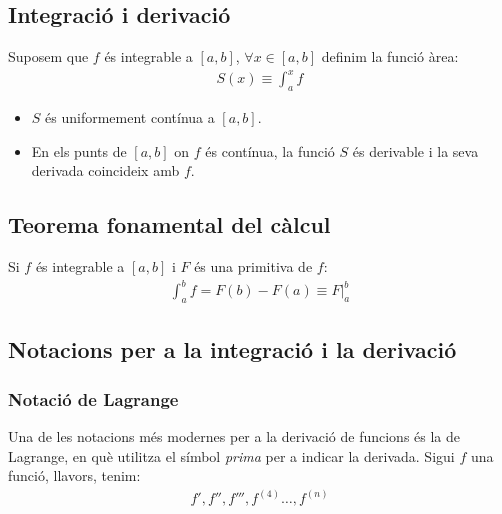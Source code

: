 \subsection{Integració i derivació}
Suposem que $f$ és integrable a $[a , b]$, $\forall x \in [a , b]$ definim la funció àrea:
\begin{align}
    S(x) \equiv \int_{a}^{x} f
\end{align}
\begin{itemize}
    \item $S$ és uniformement contínua a $[a , b]$.
    \item En els punts de $[a , b]$ on $f$ és contínua, la funció $S$ és derivable i la seva derivada coincideix amb $f$.
\end{itemize}

\subsection{Teorema fonamental del càlcul}
Si $f$ és integrable a $[a , b]$ i $F$ és una primitiva de $f$:
\begin{align}
    \int_{a}^{b} f = F(b) - F(a) \equiv \left. F \right|_{a}^{b}
\end{align}

\subsection{Notacions per a la integració i la derivació}
\subsubsection*{Notació de Lagrange}
Una de les notacions més modernes per a la derivació de funcions és la de Lagrange, en què utilitza el símbol \textit{prima} per a indicar la derivada. Sigui $f$ una funció, llavors, tenim:
\begin{align}
    f' , f'', f''' , f^{(4)} \dots , f^{(n)}
\end{align}

